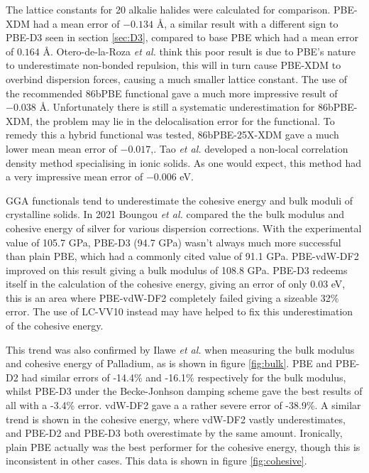 \documentclass[10pt,a4paper,twocolumn,twoside]{extarticle}
\newcommand{\al}{\emph{et al. }}
\newcommand{\oA}{\si{\angstrom}}
\begin{document}
	The lattice constants for 20 alkalie halides were calculated for comparison. PBE-XDM had a mean error of $-0.134$ \oA, a similar result with a different sign to PBE-D3 seen in section \ref{sec:D3}, compared to base PBE which had a mean error of  $0.164$ \oA. Otero-de-la-Roza \al think this poor result is due to PBE's nature to underestimate non-bonded repulsion\cite{PBE-underbinding}, this will in turn cause PBE-XDM to overbind dispersion forces, causing a much smaller lattice constant. The use of the recommended 86bPBE functional gave a much more impressive result of $-0.038$ \oA. Unfortunately there is still a systematic underestimation for 86bPBE-XDM, the problem may lie in the delocalisation error for the functional\cite{86bPBE-delocalisation}. To remedy this a hybrid functional was tested, 86bPBE-25X-XDM gave a much lower mean mean error of $-0.017$,\cite{Roza-2020-XDM}. Tao \al developed a non-local correlation density method specialising in ionic solids. As one would expect, this method had a very impressive mean error of $-0.006$ eV.\cite{Tao-vdW}

	GGA functionals tend to underestimate the cohesive energy and bulk moduli of crystalline solids. In 2021 Boungou \al compared the the bulk modulus and cohesive energy of silver for various dispersion corrections.\cite{Boungou2021} With the experimental value of 105.7 GPa, PBE-D3 (94.7 GPa) wasn't always much more successful than plain PBE, which had a commonly cited value of 91.1 GPa. PBE-vdW-DF2 improved on this result giving a bulk modulus of 108.8 GPa. PBE-D3 redeems itself in the calculation of the cohesive energy, giving an error of only 0.03 eV, this is an area where PBE-vdW-DF2 completely failed giving a sizeable 32\% error. The use of LC-VV10 instead may have helped to fix this underestimation of the cohesive energy. 

	This trend was also confirmed by Ilawe \al when measuring the bulk modulus and cohesive energy of Palladium, as is shown in figure \ref{fig:bulk}.\cite{Ilawe2015} PBE and PBE-D2 had similar errors of -14.4\% and -16.1\% respectively for the bulk modulus, whilst PBE-D3 under the Becke-Jonhson damping scheme\cite{BJ-Damp} gave the best results of all with a -3.4\% error. vdW-DF2 gave a a rather severe error of -38.9\%. A similar trend is shown in the cohesive energy, where vdW-DF2 vastly underestimates, and PBE-D2 and PBE-D3 both overestimate by the same amount. Ironically, plain PBE actually was the best performer for the cohesive energy, though this is inconsistent in other cases. This data is shown in figure \ref{fig:cohesive}.
\end{document}
